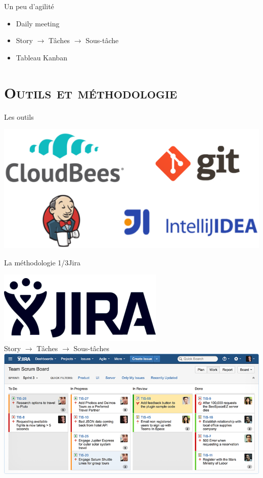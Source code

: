 \documentclass[xcolor=x11names,compress]{beamer}
\renewcommand{\(}{\begin{columns}}
\renewcommand{\)}{\end{columns}}
\newcommand{\<}[1]{\begin{column}{#1}}
\renewcommand{\>}{\end{column}}
\begin{document}
\begin{frame}{Un peu d'agilité}
  \begin{itemize}
	\item Daily meeting
	\item Story $\rightarrow$ Tâches $\rightarrow$ Sous-tâche
	\item Tableau Kanban
  \end{itemize}
\end{frame}

\section{\scshape Outils et méthodologie}
\begin{frame}{Les outils}
  \begin{center}
	\includegraphics[scale=0.45]{images/tools}
  \end{center}
\end{frame}

\begin{frame}{La méthodologie 1/3}{Jira}
  \begin{center}
	\includegraphics[scale=0.25]{images/jira}\\
	Story $\rightarrow$ Tâches $\rightarrow$ Sous-tâches\\
	\vfill
	\includegraphics[scale=0.3]{images/jira_kanban}
  \end{center}
\end{frame}
\end{document}
